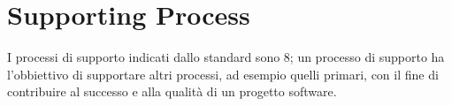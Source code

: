 \section{Supporting Process}
I processi di supporto indicati dallo standard \cite{bib:ISO12207_1997} sono 8; un processo di supporto ha l'obbiettivo di supportare altri processi, ad esempio quelli primari, con il fine di contribuire al successo e alla qualità di un progetto software.

